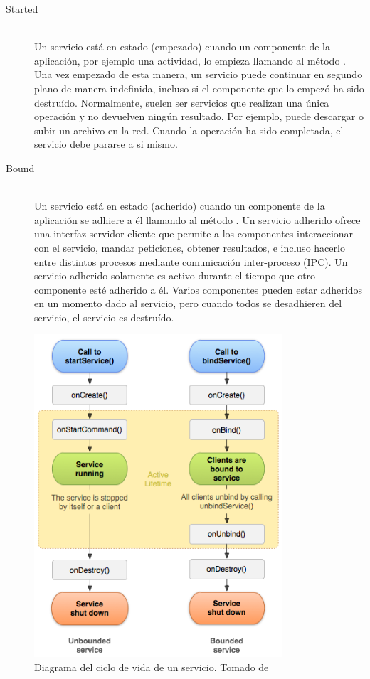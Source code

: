 \begin{description}
    \item[Started] \hfill \\
    Un servicio está en estado  (empezado) cuando un componente de la aplicación, por ejemplo una actividad, lo empieza llamando al método . Una vez empezado de esta manera, un servicio puede continuar en segundo plano de manera indefinida, incluso si el componente que lo empezó ha sido destruído. Normalmente, suelen ser servicios que realizan una única operación y no devuelven ningún resultado. Por ejemplo, puede descargar o subir un archivo en la red. Cuando la operación ha sido completada, el servicio debe pararse a si mismo.
    \item[Bound] \hfill \\
    Un servicio está en estado  (adherido) cuando un componente de la aplicación se adhiere a él llamando al método . Un servicio adherido ofrece una interfaz servidor-cliente que permite a los componentes interaccionar con el servicio, mandar peticiones, obtener resultados, e incluso hacerlo entre distintos procesos mediante comunicación inter-proceso (IPC). Un servicio adherido solamente es activo durante el tiempo que otro componente esté adherido a él. Varios componentes pueden estar adheridos en un momento dado al servicio, pero cuando todos se desadhieren del servicio, el servicio es destruído.

\end{description}

\begin{figure}[h] \centering
    \includegraphics[height=12cm]{graphs/service_lifecycle.png} \caption{Diagrama del ciclo de vida de un servicio. Tomado de \cite{androiddevguide}}\label{fig:diagrama:ServiceLifecycle}
\end{figure}

